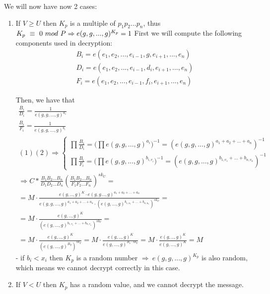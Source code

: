 \documentclass[a4paper, 12pt, oneside]{article}
\begin{document}
We will now have now 2 cases:
\begin{enumerate}
\item If $V \geq U$ then $K_p$ is a multiple of $p_1p_2...p_n$, thus $K_p\ \equiv \ 0\ mod\ P\Rightarrow\ \\ e(g, g, ..., g)^{K_p} = 1$
First we will compute the following components used in decryption:
\begin{align*}
B_i = e(e_1, e_2, ..., e_{i-1}, g, e_{i+1}, ..., e_n) \\
D_i = e(e_1, e_2, ..., e_{i-1}, d_i, e_{i+1}, ..., e_n)\\
F_i = e(e_1, e_2, ..., e_{i-1}, f_i, e_{i+1}, ..., e_n)
\end{align*}

Then, we have that
\begin{gather}
\frac{B_i}{D_i} = \frac{1}{e(g, g, ..., g)^{a_i}}\\
\frac{B_i}{F_i} = \frac{1}{e(g, g, ..., g)^{b_i}}\\
(1) (2) \Rightarrow \begin{cases}
\displaystyle
\prod{\frac{B_i}{D_i}} = 
(\prod{e(g, g, ..., g)^{a_i})^{-1}} = 
(e(g, g, ..., g)^{a_1+a_2+...+a_n})^{-1} \\
\displaystyle
\prod{\frac{B_i}{F_i}} = 
(\prod{e(g, g, ..., g)^{b_{i, v_i}})^{-1}} = 
(e(g, g, ..., g)^{b_{1, v_1}+...+b_{n, v_n}})^{-1}
\end{cases} \\
\Rightarrow 
C*\frac{B_1B_2...B_n}{D_1D_2...D_n}\left(\frac{B_1B_2...B_n}{F_1F_2...F_n}\right)^{sk_U} = \\
= M\cdot  \frac{e(g,.., g)^K \cdot e(g, g..., g)^{a_1 + a_2 + ...+a_n}}{e(g, g, ..., g)^{a_1 + a_2 + ... + a_n} \cdot \left( e(g, ..., g)^{b_{1, u_1}+...+b_{n, u_n}} \right) ^ {sk_U}} =\\
= M\cdot \frac{e(g,.., g)^K }{\left( e(g, ..., g)^{b_{1, v_1}+...+b_{n, v_n}} \right) ^ {sk_V}} =\\ 
= M\cdot \frac{e(g,.., g)^K }{\left( e(g, ..., g)^{B_V} \right) ^ {sk_V}} 
= M\cdot \frac{e(g,.., g)^K }{e(g, ..., g)^{B_v \cdot {sk_V}}}
= M\cdot \frac{e(g,.., g)^K }{e(g, ..., g)^K} = M
\end{gather}
- if $b_i < x_i$ then $K_p$ is a random number $\Rightarrow\ e(g, g, ..., g)^{K_p}$ is also random, which means we cannot decrypt correctly in this case.

\item If $V < U$ then $K_p$ has a random value, and we cannot decrypt the message.


\end{enumerate}
\end{document}
